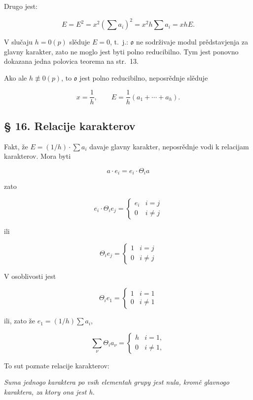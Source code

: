 \documentclass[11pt]{article}
\begin{document}
Drugo jest:

\[
E=E^2=x^2\left(\sum a_i\right)^2=x^2h\sum a_i=xhE.
\]

V slučaju \(h=0(p)\) slěduje \(E=0\), t.~j.: \(\mathfrak o\) ne sodrživaje modul prědstavjenja za glavny karakter, zato ne moglo jest byti polno reducibilno. Tym jest ponovno dokazana jedna polovica teorema na str.~13.

Ako ale \(h\not\equiv0(p)\), to \(\mathfrak o\) jest polno reducibilno, neposrědnje slěduje

\[
x=\frac{1}{h},\qquad E=\frac{1}{h}(a_1+\cdots+a_h).
\]

\subsection*{§ 16. Relacije karakterov}\label{die-charakterenrelationen}

Fakt, že \(E=(1/h)\cdot\sum a_i\) davaje glavny karakter, neposrědnje vodi k relacijam karakterov. Mora byti

\[a \cdot e_i = e_i \cdot \Theta_i a\]

zato

\[e_i \cdot \Theta_i e_j = \begin{cases} e_i & i = j \\ 0 & i \neq j \end{cases}\]

ili

\[\Theta_i e_j = \begin{cases} 1 & i = j \\ 0 & i \neq j \end{cases}\]

V osoblivosti jest

\[\Theta_i e_1 = \begin{cases} 1 & i = 1 \\ 0 & i \neq 1 \end{cases}\]

ili, zato že \(e_1 = (1/h) \sum a_i\),

\[
\sum_\nu \Theta_i a_\nu=\begin{cases} h & i=1,\\ 0 & i\ne 1, \end{cases}
\]

To sut poznate relacije karakterov:

\emph{Suma jednogo karaktera po vsih elementah grupy jest nula, kromě glavnogo karaktera, za ktory ona jest h.}
\end{document}
